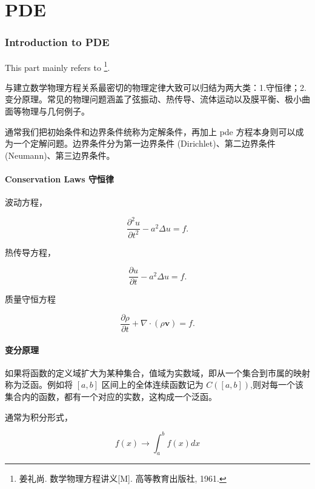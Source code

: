 \part{PDE}
\section{Introduction to PDE}

This part mainly refers to \footnote{姜礼尚. 数学物理方程讲义[M]. 高等教育出版社, 1961.}.

与建立数学物理方程关系最密切的物理定律大致可以归结为两大类：1.守恒律；2.变分原理。常见的物理问题涵盖了弦振动、热传导、流体运动以及膜平衡、极小曲面等物理与几何例子。

通常我们把初始条件和边界条件统称为定解条件，再加上 pde 方程本身则可以成为一个定解问题。边界条件分为第一边界条件 (Dirichlet)、第二边界条件 (Neumann)、第三边界条件。

\subsection{Conservation Laws 守恒律}
波动方程，

\begin{equation}
\frac{\partial^2 u}{\partial t^2}-a^2\Delta u =f.
\end{equation}

热传导方程，

\begin{equation}
\frac{\partial u}{\partial t}-a^2\Delta u =f.
\end{equation}

质量守恒方程

\begin{equation}
\frac{\partial \rho}{\partial t}+\nabla\cdot (\rho \boldsymbol{v}) =f.
\end{equation}

\subsection{变分原理}

如果将函数的定义域扩大为某种集合，值域为实数域，即从一个集合到市属的映射称为泛函。例如将 $[a,b]$ 区间上的全体连续函数记为 $C([a,b])$,则对每一个该集合内的函数，都有一个对应的实数，这构成一个泛函。

通常为积分形式，

\begin{equation}
f(x) \rightarrow \int_a^b f(x)dx
\end{equation}

